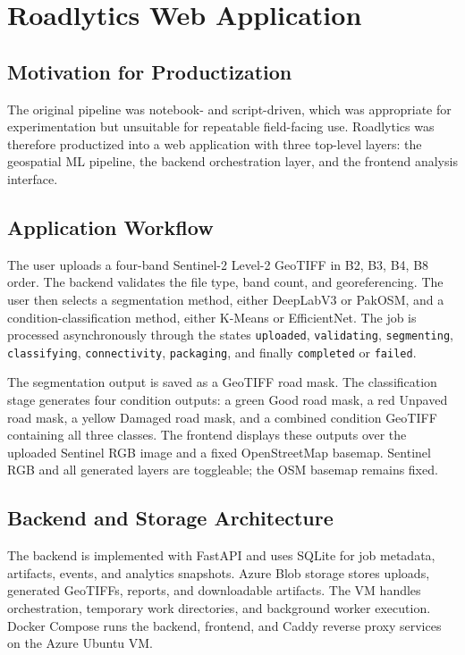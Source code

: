 ﻿\documentclass[conference]{IEEEtran}
\begin{document}
\section{Roadlytics Web Application}
\subsection{Motivation for Productization}
The original pipeline was notebook- and script-driven, which was appropriate for experimentation but unsuitable for repeatable field-facing use. Roadlytics was therefore productized into a web application with three top-level layers: the geospatial ML pipeline, the backend orchestration layer, and the frontend analysis interface.

\subsection{Application Workflow}
The user uploads a four-band Sentinel-2 Level-2 GeoTIFF in B2, B3, B4, B8 order. The backend validates the file type, band count, and georeferencing. The user then selects a segmentation method, either DeepLabV3 or PakOSM, and a condition-classification method, either K-Means or EfficientNet. The job is processed asynchronously through the states \texttt{uploaded}, \texttt{validating}, \texttt{segmenting}, \texttt{classifying}, \texttt{connectivity}, \texttt{packaging}, and finally \texttt{completed} or \texttt{failed}.

The segmentation output is saved as a GeoTIFF road mask. The classification stage generates four condition outputs: a green Good road mask, a red Unpaved road mask, a yellow Damaged road mask, and a combined condition GeoTIFF containing all three classes. The frontend displays these outputs over the uploaded Sentinel RGB image and a fixed OpenStreetMap basemap. Sentinel RGB and all generated layers are toggleable; the OSM basemap remains fixed.

\subsection{Backend and Storage Architecture}
The backend is implemented with FastAPI and uses SQLite for job metadata, artifacts, events, and analytics snapshots. Azure Blob storage stores uploads, generated GeoTIFFs, reports, and downloadable artifacts. The VM handles orchestration, temporary work directories, and background worker execution. Docker Compose runs the backend, frontend, and Caddy reverse proxy services on the Azure Ubuntu VM.
\end{document}

